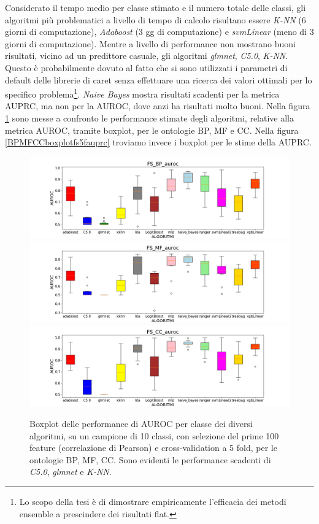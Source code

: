 \documentclass[12pt]{report}
\begin{document}
Considerato il tempo medio per classe stimato e il numero totale delle classi, gli algoritmi più problematici a livello di tempo di calcolo risultano essere \emph{K-NN} (6 giorni di computazione),\emph{ Adaboost }(3 gg di computazione) e \emph{svmLinear} (meno di 3 giorni di computazione). Mentre a livello di performance non mostrano buoni risultati, vicino ad un predittore casuale, gli algoritmi \emph{glmnet}, \emph{C5.0}, \emph{K-NN}. Questo è probabilmente dovuto al fatto che si sono utilizzati i parametri di default delle librerie di caret senza effettuare una ricerca dei valori ottimali per lo specifico problema\footnote{\footnotesize{Lo scopo della tesi è di dimostrare empiricamente l'efficacia dei metodi ensemble a prescindere dei risultati flat.}}. \emph{Naive Bayes} mostra risultati scadenti per la metrica AUPRC, ma non per la AUROC, dove anzi ha risultati molto buoni. Nella figura \ref{BPMFCCboxplotfs5f} sono messe a confronto le performance stimate degli algoritmi, relative alla metrica AUROC, tramite boxplot, per le ontologie BP, MF e CC. Nella figura \ref{BPMFCCboxplotfs5fauprc} troviamo invece i boxplot per le stime della AUPRC.
\begin{figure}[hp!]
\centering
\includegraphics[scale=0.37]{./images/FS_BP_auroc.png}
\includegraphics[scale=0.37]{./images/FS_MF_auroc.png}
\includegraphics[scale=0.37]{./images/FS_CC_auroc.png}
\caption{\footnotesize{Boxplot delle performance di AUROC per classe dei diversi algoritmi, su un campione di 10 classi, con selezione del prime 100 feature (correlazione di Pearson) e cross-validation a 5 fold, per le ontologie BP, MF, CC. Sono evidenti le performance scadenti di \emph{C5.0}, \emph{glmnet} e \emph{K-NN}.}}
\label{BPMFCCboxplotfs5f}
\end{figure}
\end{document}
